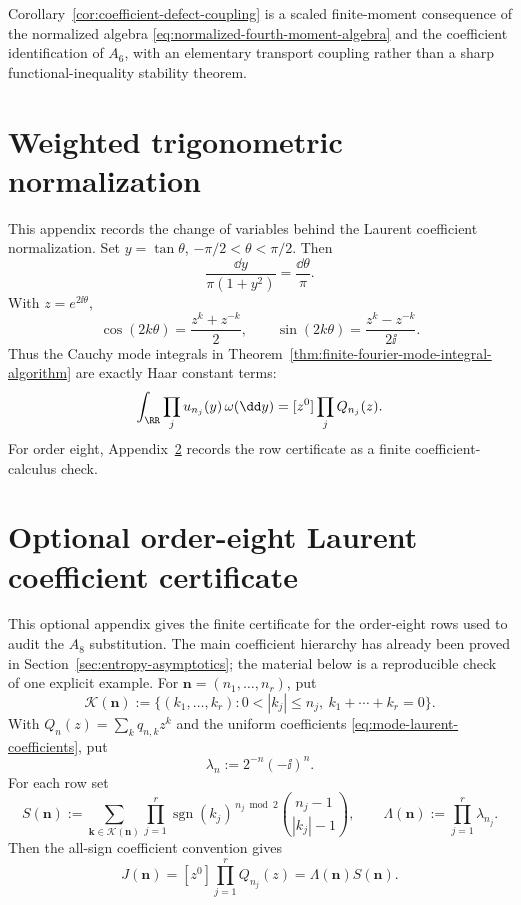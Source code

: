 \begin{remark}
Corollary~\ref{cor:coefficient-defect-coupling} is a scaled finite-moment
consequence of the normalized algebra
\eqref{eq:normalized-fourth-moment-algebra} and the coefficient
identification of \(A_6\), with an elementary transport coupling rather than a
sharp functional-inequality stability theorem.
\end{remark}

\section{Weighted trigonometric normalization}%
\label{app:entropy-integrals}

This appendix records the change of variables behind the Laurent coefficient
normalization.  Set \(y=\tan\theta\),
\(-\pi/2<\theta<\pi/2\).  Then
\[
  \frac{\dd y}{\pi(1+y^2)}=\frac{\dd\theta}{\pi}.
\]
With \(z=e^{2\ii\theta}\),
\[
  \cos(2k\theta)=\frac{z^k+z^{-k}}2,\qquad
  \sin(2k\theta)=\frac{z^k-z^{-k}}{2\ii}.
\]
Thus the Cauchy mode integrals in
Theorem~\ref{thm:finite-fourier-mode-integral-algorithm} are exactly Haar
constant terms:
\[
  \int_{\RR}\prod_j u_{n_j}(y)\,\omega(\dd y)
  =[z^0]\prod_j Q_{n_j}(z).
\]
For order eight, Appendix~\ref{app:order-eight-laurent-certificate} records
the row certificate as a finite coefficient-calculus check.

\section{Optional order-eight Laurent coefficient certificate}%
\label{app:order-eight-laurent-certificate}

This optional appendix gives the finite certificate for the order-eight rows
used to audit the \(A_8\) substitution.  The main coefficient hierarchy has
already been proved in Section~\ref{sec:entropy-asymptotics}; the material
below is a reproducible check of one explicit example.
For
\(\mathbf n=(n_1,\ldots,n_r)\), put
\[
\mathcal K(\mathbf n)
:=\{(k_1,\ldots,k_r):0<|k_j|\le n_j,\ k_1+\cdots+k_r=0\}.
\]
With \(Q_n(z)=\sum_kq_{n,k}z^k\) and the uniform coefficients
\eqref{eq:mode-laurent-coefficients}, put
\[
\lambda_n:=2^{-n}(-\ii)^n .
\]
For each row set
\[
S(\mathbf n):=
\sum_{\mathbf k\in\mathcal K(\mathbf n)}
\prod_{j=1}^r
\operatorname{sgn}(k_j)^{\,n_j\bmod2}
\binom{n_j-1}{|k_j|-1},
\qquad
\Lambda(\mathbf n):=\prod_{j=1}^r\lambda_{n_j}.
\]
Then the all-sign coefficient convention gives
\[
J(\mathbf n)=[z^0]\prod_{j=1}^rQ_{n_j}(z)
=\Lambda(\mathbf n)S(\mathbf n).
\]

